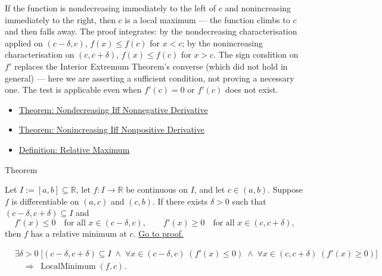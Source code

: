 \begin{remark*}[Interpretation]
If the function is nondecreasing immediately to the left of $c$ and nonincreasing immediately to the right, then $c$ is a local maximum --- the function climbs to $c$ and then falls away. The proof integrates: by the nondecreasing characterisation applied on $(c-\delta,c)$, $f(x) \leq f(c)$ for $x < c$; by the nonincreasing characterisation on $(c,c+\delta)$, $f(x) \leq f(c)$ for $x > c$. The sign condition on $f'$ replaces the Interior Extremum Theorem's converse (which did not hold in general) --- here we are asserting a sufficient condition, not proving a necessary one. The test is applicable even when $f'(c) = 0$ or $f'(c)$ does not exist.
\end{remark*}

\begin{remark*}[Dependencies]
\begin{itemize}
  \item \hyperref[thm:nondecreasing-iff-nonneg-derivative]{Theorem: Nondecreasing Iff Nonnegative Derivative}
  \item \hyperref[thm:nonincreasing-iff-nonpos-derivative]{Theorem: Nonincreasing Iff Nonpositive Derivative}
  \item \hyperref[def:relative-maximum]{Definition: Relative Maximum}
\end{itemize}
\end{remark*}


\begin{theorembox}{Theorem}
\begin{theorem}
\label{thm:first-derivative-test-minimum}
Let $I := [a,b] \subseteq \mathbb{R}$, let $f : I \to \mathbb{R}$ be continuous on $I$, and let $c \in (a,b)$. Suppose $f$ is differentiable on $(a,c)$ and $(c,b)$. If there exists $\delta > 0$ such that $(c-\delta,c+\delta) \subseteq I$ and
\[
f'(x) \leq 0 \quad \text{for all } x \in (c-\delta,c),
\qquad
f'(x) \geq 0 \quad \text{for all } x \in (c,c+\delta),
\]
then $f$ has a relative minimum at $c$.
\hyperref[prf:first-derivative-test-minimum]{Go to proof.}
\end{theorem}
\end{theorembox}

\begin{remark*}
\begin{align*}
&\exists \delta > 0\;\bigl[(c-\delta,c+\delta)\subseteq I
\;\land\;
\forall x\in(c-\delta,c)\;(f'(x)\leq 0)
\;\land\;
\forall x\in(c,c+\delta)\;(f'(x)\geq 0)\bigr]\\
&\quad\Rightarrow\; \operatorname{LocalMinimum}(f,c).
\end{align*}
\end{remark*}

